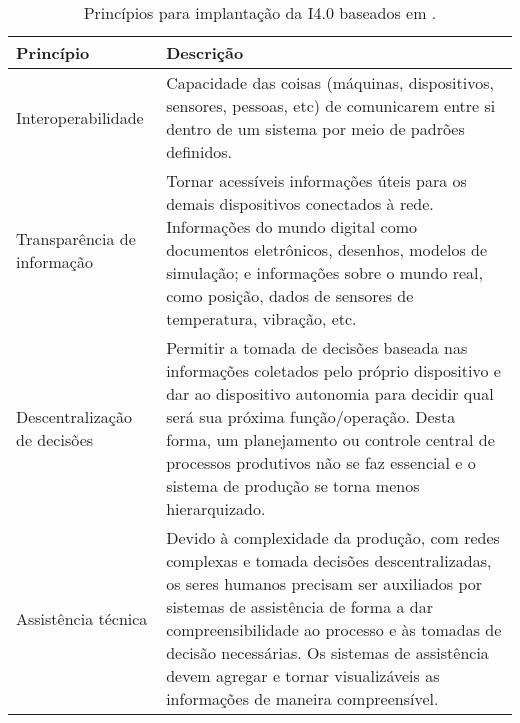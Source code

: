 \begin{table}[t]
	\centering
	\footnotesize
	\caption{Princípios para implantação da I4.0 baseados em .}
	\label{tab:principios-i4}
	\begin{tabular}{p{3cm}p{12cm}}
		\hline
		\textbf{Princípio}           & \textbf{Descrição}                                                                                                                                                                                                                                                                                                           \\

		\hline
		Interoperabilidade           &
		Capacidade das coisas (máquinas, dispositivos, sensores, pessoas, etc) de comunicarem entre si dentro de um sistema por meio de padrões definidos.                                                                                                                                                                                                          \\

		\hline
		Transparência de informação  &
		Tornar acessíveis informações úteis para os demais dispositivos conectados à rede. Informações do mundo digital como documentos eletrônicos, desenhos, modelos de simulação; e informações sobre o mundo real, como posição, dados de sensores de temperatura, vibração, etc.                                                                               \\

		\hline
		Descentralização de decisões &
		Permitir a tomada de decisões baseada nas informações coletados pelo próprio dispositivo e dar ao dispositivo autonomia para decidir qual será sua próxima função/operação. Desta forma, um planejamento ou controle central de processos produtivos não se faz essencial e o sistema de produção se torna menos hierarquizado.                             \\

		\hline
		Assistência técnica          &
		Devido à complexidade da produção, com redes complexas e tomada decisões descentralizadas, os seres humanos precisam ser auxiliados por sistemas de assistência de forma a dar compreensibilidade ao processo e às tomadas de decisão necessárias. Os sistemas de assistência devem agregar e tornar visualizáveis as informações de maneira compreensível. \\

		\hline
	\end{tabular}
\end{table}

